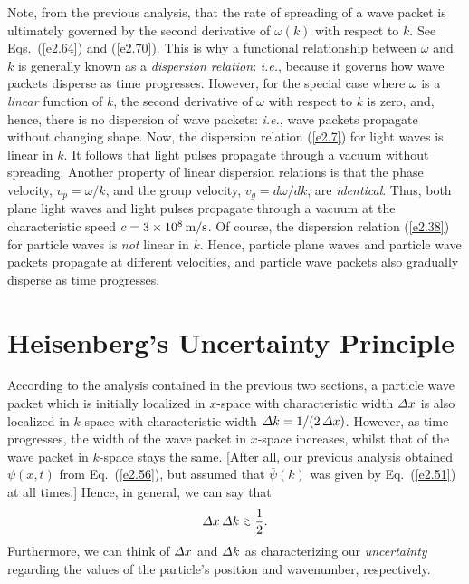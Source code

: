 Note, from the previous analysis, that the rate of spreading of a wave packet is ultimately
governed by the second derivative of  $\omega(k)$
with respect to $k$.  See Eqs.~(\ref{e2.64}) and (\ref{e2.70}). This is why a functional relationship between $\omega$ and $k$
is generally known as a {\em dispersion relation}: {\em i.e.}, because it
governs how wave packets  disperse as time progresses.
However, for the special case where $\omega$ is a {\em linear}\/ function
of $k$, the second derivative of $\omega$ with respect to $k$ is zero,
and, hence, there is no dispersion of wave packets: {\em i.e.}, wave packets
propagate without changing shape. Now, the dispersion relation
(\ref{e2.7}) for light waves is linear in $k$. It follows that light pulses
propagate through a vacuum without spreading. Another property
of linear dispersion relations is that the phase velocity, $v_p=\omega/k$, and
the group velocity, $v_g=d\omega/dk$, are {\em identical}. Thus, both plane light waves
and light pulses propagate through a vacuum at the characteristic
speed $c=3\times 10^8\,{\rm m/s}$. Of course, the dispersion relation (\ref{e2.38}) for particle waves is {\em not}\/ linear in $k$. Hence, particle
plane waves and particle wave packets propagate at different velocities,
and particle wave packets also gradually disperse as time progresses.

\section{Heisenberg's Uncertainty Principle}\label{sun}
According to the analysis contained in the previous two sections, a particle
wave packet which is initially localized in $x$-space with characteristic
width ${\mit\Delta}x$ is also localized in $k$-space with characteristic
width ${\mit\Delta}k= 1/(2\,{\mit\Delta} x)$. However, as time progresses,
the width of the wave packet in $x$-space increases, whilst that of the wave packet in $k$-space stays the same. [After all, our
previous analysis obtained $\psi(x,t)$ from Eq.~(\ref{e2.56}), but assumed
that $\bar{\psi}(k)$ was given by Eq.~(\ref{e2.51}) at all times.] Hence,
in general, we can say that
\begin{equation}
{\mit\Delta}x\,{\mit\Delta} k\gtapp \frac{1}{2}.
\end{equation}
Furthermore, we can think of ${\mit\Delta}x$ and ${\mit\Delta} k$ as
characterizing our {\em uncertainty}\/ regarding the values of the particle's
position and wavenumber, respectively.

